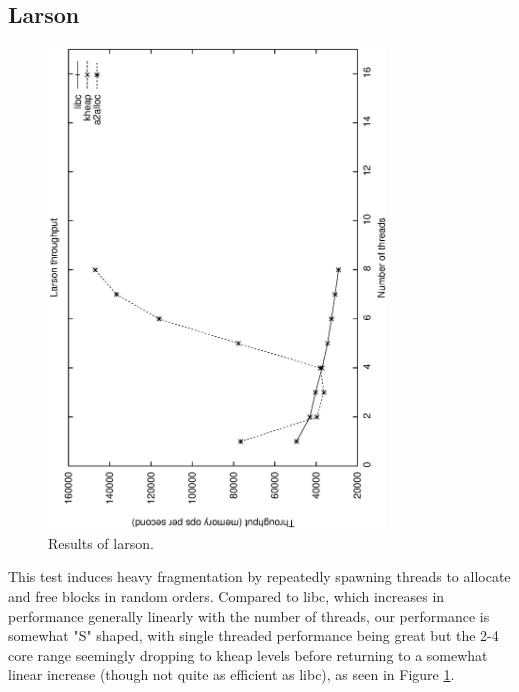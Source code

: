 \documentclass[11pt,twoside]{article}
\begin{document}
\subsection{Larson}
\begin{figure}[!htbp]
    \centering
    \includegraphics[width=0.8\textwidth]{larson.ps}
    \caption{Results of larson.}
    \label{fig:larson}
\end{figure}

This test induces heavy fragmentation by repeatedly spawning threads to allocate and free blocks in random orders. Compared to libc, which increases in performance generally linearly with the number of threads, our performance is somewhat "S" shaped, with single threaded performance being great but the 2-4 core range seemingly dropping to kheap levels before returning to a somewhat linear increase (though not quite as efficient as libc), as seen in Figure \ref{fig:larson}.
\end{document}
